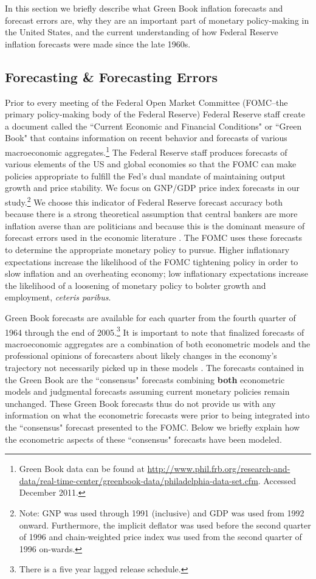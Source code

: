 \documentclass[a4paper]{article}\usepackage{graphicx, color}
\begin{document}
In this section we briefly describe what Green Book inflation forecasts and forecast errors are, why they are an important part of monetary policy-making in the United States, and the current understanding of how Federal Reserve inflation forecasts were made since the late 1960s.

\subsection{Forecasting \& Forecasting Errors}

Prior to every meeting of the Federal Open Market Committee (FOMC--the primary policy-making body of the Federal Reserve) Federal Reserve staff create a document called the ``Current Economic and Financial Conditions" or ``Green Book" that contains information on recent behavior and forecasts of various macroeconomic aggregates.\footnote{Green Book data can be found at {\url{http://www.phil.frb.org/research-and-data/real-time-center/greenbook-data/philadelphia-data-set.cfm}}. Accessed December 2011.} The Federal Reserve staff produces forecasts of various elements of the US and global economies so that the FOMC can make policies appropriate to fulfill the Fed's dual mandate of maintaining output growth and price stability. We focus on GNP/GDP price index forecasts in our study.\footnote{Note: GNP was used through 1991 (inclusive) and GDP was used from 1992 onward. Furthermore, the implicit deflator was used before the second quarter of 1996 and chain-weighted price index was used from the second quarter of 1996 on-wards.} We choose this indicator of Federal Reserve forecast accuracy both because there is a strong theoretical assumption that central bankers are more inflation averse than are politicians \citep{Cukierman1992} and because this is the dominant measure of forecast errors used in the economic literature \citep[c.f.][]{Romer2000}. The FOMC uses these forecasts to determine the appropriate monetary policy to pursue. Higher inflationary expectations increase the likelihood of the FOMC tightening policy in order to slow inflation and an overheating economy; low inflationary expectations increase the likelihood of a loosening of monetary policy to bolster growth and employment, \emph{ceteris paribus}.

Green Book forecasts are available for each quarter from the fourth quarter of 1964 through the end of 2005.\footnote{There is a five year lagged release schedule.} It is important to note that finalized forecasts of macroeconomic aggregates are a combination of both econometric models and the professional opinions of forecasters about likely changes in the economy's trajectory not necessarily picked up in these models \citep{Karamouzis1989,Reifschneider1997}. The forecasts contained in the Green Book are the ``consensus" forecasts combining {\bf{both}} econometric models and judgmental forecasts assuming current monetary policies remain unchanged. These Green Book forecasts thus do not provide us with any information on what the econometric forecasts were prior to being integrated into the ``consensus" forecast presented to the FOMC. Below we briefly explain how the econometric aspects of these ``consensus" forecasts have been modeled.
\end{document}
